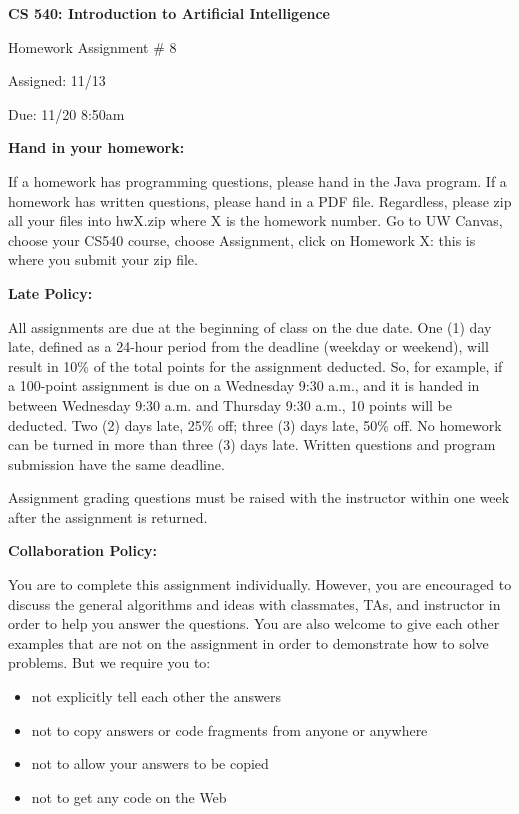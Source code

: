 \documentclass{article}
\begin{document}
\begin{center}
{\bf \large CS 540: Introduction to Artificial Intelligence

Homework Assignment \# 8

\vspace{0.5cm}

Assigned:  11/13 

Due:  11/20 8:50am} 
\end{center}

\vspace{1cm}

\begin{center}
{\bf \Large Hand in your homework:}
\end{center}

If a homework has programming questions, please hand in the Java program.  
If a homework has written questions, please hand in a PDF file.
Regardless, please zip all your files into hwX.zip where X is the homework number.
Go to UW Canvas, choose your CS540 course, choose Assignment, click on Homework X: this is where you submit your zip file. 

\vspace{1cm}

\begin{center}
{\bf \Large Late Policy:}
\end{center}

All assignments are due at the beginning of class on the due date. One (1) day late, defined as a 24-hour period from the deadline (weekday or weekend), will result in 10\% of the  total points for the assignment deducted.  So, for example, if a 100-point assignment is due on a Wednesday 9:30 a.m., and it is handed in between Wednesday 9:30 a.m. and Thursday 9:30 a.m., 10 points will be deducted. Two (2) days late, 25\% off; three (3) days late, 50\% off. No homework can be turned in more than three (3) days late. Written questions and program submission have the same deadline.  

Assignment grading questions must be raised with the instructor within one week after the assignment is returned.

\vspace{4pt}

\begin{center}
{\bf \Large Collaboration Policy:}
\end{center}

You  are  to  complete  this  assignment  individually.  However,  you  are  encouraged  to  discuss  the  general algorithms and ideas with classmates, TAs, and instructor in order to help you answer the questions. You are also welcome to give each other examples that are not on the assignment in order to demonstrate how to solve problems. But we require you to:
\begin{itemize}
\item not explicitly tell each other the answers
\item not to copy answers or code fragments from anyone or anywhere
\item not to allow your answers to be copied
\item not to get any code on the Web
\end{itemize}
\end{document}

